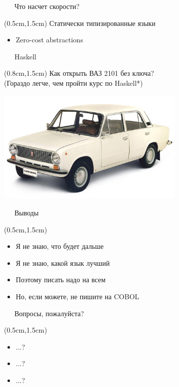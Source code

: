\documentclass[xetex,18pt,aspectratio=43]{beamer}
\begin{document}
\begin{Large}
\begin{frame}{\ \ \ Что насчет скорости?}
\begin{textblock*}{\framewidth}(0.5cm,1.5cm)
  Статически типизированные языки
\begin{itemize}
  \item Zero-cost abstractions
\end{itemize}
\end{textblock*}
\end{frame}

\begin{frame}{\ \ \ Haskell}
\begin{textblock*}{\framewidth}(0.8cm,1.5cm)
Как открыть ВАЗ 2101 без ключа?\\
{\small (Гораздо легче, чем пройти курс по Haskell*)}
\begin{minipage}{\textwidth}
  \centering
  \includegraphics[height=5.5cm]{img/lada_2101_1.jpg}
\end{minipage}
\end{textblock*}
\end{frame}

\begin{frame}{\ \ \ Выводы}
\begin{textblock*}{\framewidth-0.8cm}(0.5cm,1.5cm)
\begin{itemize}
  \item Я не знаю, что будет дальше
  \item Я не знаю, какой язык лучший
  \item Поэтому писать надо на всем
  \item Но, если можете, не пишите на COBOL
\end{itemize}
\end{textblock*}
\end{frame}

\begin{frame}{\ \ \ Вопросы, пожалуйста?}
\begin{textblock*}{\framewidth-0.8cm}(0.5cm,1.5cm)
\begin{itemize}
  \item ...?
  \item ...?
  \item ...?
\end{itemize}
\end{textblock*}
\end{frame}


\end{Large}
\end{document}
